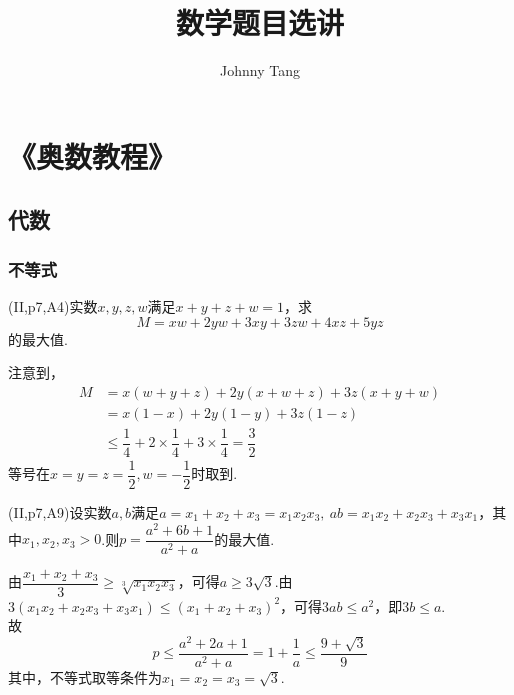 \documentclass[cn,hazy,black,10pt,normal]{elegantnote}
\title{数学题目选讲}
\author{Johnny Tang}
\institute{Chengdu Jiaxiang Foreign Languages School}
\date{\zhtoday}
\begin{document}
\maketitle

\part{《奥数教程》}

\chapter{代数}

\section{不等式}

\begin{problem}
	(II,p7,A4)实数$x,y,z,w$满足$x+y+z+w=1$，求$$M=xw+2yw+3xy+3zw+4xz+5yz$$的最大值.
\end{problem}
\begin{solution}
	注意到，
	\begin{align*}
		M &= x(w+y+z)+2y(x+w+z)+3z(x+y+w) \\
		&= x(1-x) + 2y(1-y) + 3z(1-z) \\
		&\leq \dfrac{1}{4} + 2\times \dfrac{1}{4} + 3\times \dfrac{1}{4} = \dfrac{3}{2}
	\end{align*}
	等号在$x=y=z=\dfrac{1}{2},w=-\dfrac{1}{2}$时取到.
\end{solution}

\begin{problem}
	(II,p7,A9)设实数$a,b$满足$a=x_1+x_2+x_3=x_1x_2x_3,~ab=x_1x_2+x_2x_3+x_3x_1$，其中$x_1,x_2,x_3>0$.则$p=\dfrac{a^2+6b+1}{a^2+a}$的最大值.
\end{problem}
\begin{solution}
	由$\dfrac{x_1+x_2+x_3}{3} \geq \sqrt[3]{x_1x_2x_3}$，可得$a \geq 3\sqrt{3}$.由$3(x_1x_2+x_2x_3+x_3x_1) \leq (x_1+x_2+x_3)^2$，可得$3ab \leq a^2$，即$3b \leq a$. \\
	故$$p \leq \frac{a^2+2a+1}{a^2+a} = 1+\frac{1}{a} \leq \frac{9+\sqrt{3}}{9}$$其中，不等式取等条件为$x_1=x_2=x_3=\sqrt{3}$.
\end{solution}
\end{document}
